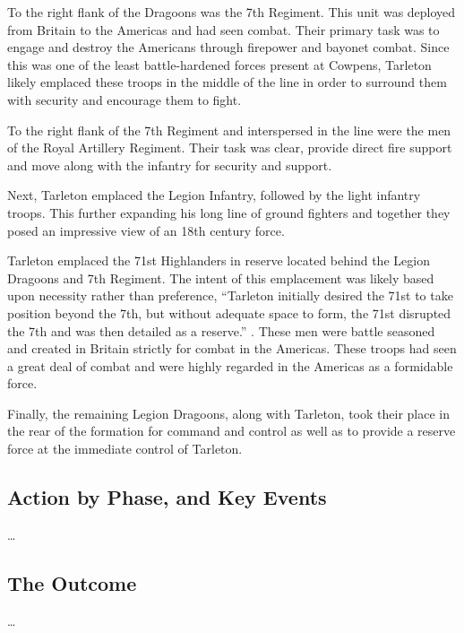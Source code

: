 To the right flank of the Dragoons was the 7th Regiment. This unit was deployed
from Britain to the Americas and had seen combat. Their primary task was to
engage and destroy the Americans through firepower and bayonet combat. Since
this was one of the least battle-hardened forces present at Cowpens, Tarleton
likely emplaced these troops in the middle of the line in order to surround
them with security and encourage them to fight.

To the right flank of the 7th Regiment and interspersed in the line were the
men of the Royal Artillery Regiment. Their task was clear, provide direct fire
support and move along with the infantry for security and support.

Next, Tarleton emplaced the Legion Infantry, followed by the light infantry
troops. This further expanding his long line of ground fighters and together
they posed an impressive view of an 18th century force.

Tarleton emplaced the 71st Highlanders in reserve located behind the Legion
Dragoons and 7th Regiment. The intent of this emplacement was likely based upon
necessity rather than preference, ``Tarleton initially desired the 71st to take
position beyond the 7th, but without adequate space to form, the 71st disrupted
the 7th and was then detailed as a reserve.'' \cite[84]{babits_devil_2001}. These men were
battle seasoned and created in Britain strictly for combat in the Americas.
These troops had seen a great deal of combat and were highly regarded in the
Americas as a formidable force.

Finally, the remaining Legion Dragoons, along with Tarleton, took their place
in the rear of the formation for command and control as well as to provide a
reserve force at the immediate control of Tarleton.

\subsection{Action by Phase, and Key Events}

\ldots

\subsection{The Outcome}

\ldots

